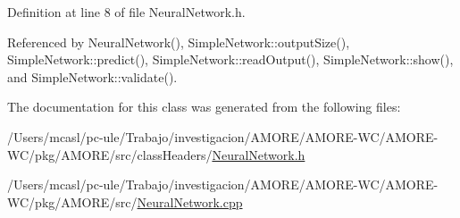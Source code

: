 Definition at line 8 of file NeuralNetwork.h.



Referenced by NeuralNetwork(), SimpleNetwork::outputSize(), SimpleNetwork::predict(), SimpleNetwork::readOutput(), SimpleNetwork::show(), and SimpleNetwork::validate().



The documentation for this class was generated from the following files:\begin{DoxyCompactItemize}
\item 
/Users/mcasl/pc-\/ule/Trabajo/investigacion/AMORE/AMORE-\/WC/AMORE-\/WC/pkg/AMORE/src/classHeaders/\hyperlink{_neural_network_8h}{NeuralNetwork.h}\item 
/Users/mcasl/pc-\/ule/Trabajo/investigacion/AMORE/AMORE-\/WC/AMORE-\/WC/pkg/AMORE/src/\hyperlink{_neural_network_8cpp}{NeuralNetwork.cpp}\end{DoxyCompactItemize}
